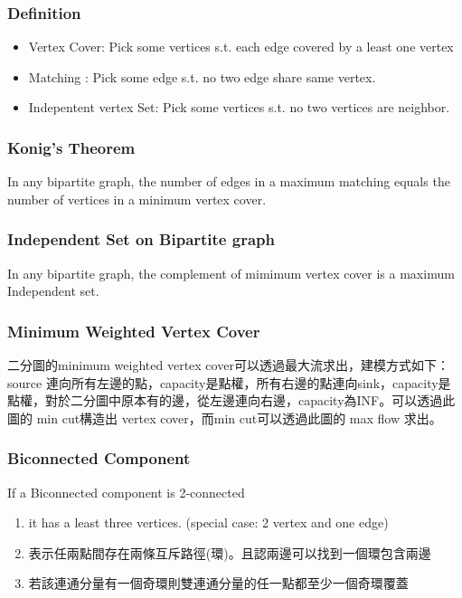 \subsubsection{Definition}
\begin{itemize}
	\setlength\itemsep{-0.5em}
	\item Vertex Cover: Pick some vertices s.t. each edge covered by a least one vertex
	\item Matching : Pick some edge s.t. no two edge share same vertex.
	\item Indepentent vertex Set: Pick some vertices s.t. no two vertices are neighbor.
\end{itemize}


\subsubsection{Konig's Theorem}

In any bipartite graph, the number of edges in a maximum matching equals the number of vertices in a minimum vertex cover.

\subsubsection{Independent Set on Bipartite graph}

In any bipartite graph, the complement of mimimum vertex cover is a maximum Independent set.

\subsubsection{Minimum Weighted Vertex Cover}

二分圖的minimum weighted vertex cover可以透過最大流求出，建模方式如下：source 連向所有左邊的點，capacity是點權，所有右邊的點連向sink，capacity是點權，對於二分圖中原本有的邊，從左邊連向右邊，capacity為INF。可以透過此圖的 min cut構造出 vertex cover，而min cut可以透過此圖的 max flow 求出。

\subsubsection{Biconnected Component}
If a Biconnected component is 2-connected
\begin{enumerate}
	\setlength\itemsep{-0.5em}
	\item it has a least three vertices. (special case: 2 vertex and one edge)
	\item 表示任兩點間存在兩條互斥路徑(環)。且認兩邊可以找到一個環包含兩邊
	\item 若該連通分量有一個奇環則雙連通分量的任一點都至少一個奇環覆蓋
\end{enumerate}

